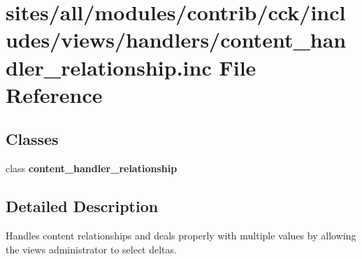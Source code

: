 \hypertarget{content__handler__relationship_8inc}{
\section{sites/all/modules/contrib/cck/includes/views/handlers/content\_\-handler\_\-relationship.inc File Reference}
\label{content__handler__relationship_8inc}
}
\subsection*{Classes}
\begin{CompactItemize}
\item 
class \textbf{content\_\-handler\_\-relationship}
\end{CompactItemize}


\subsection{Detailed Description}
Handles content relationships and deals properly with multiple values by allowing the views administrator to select deltas. 